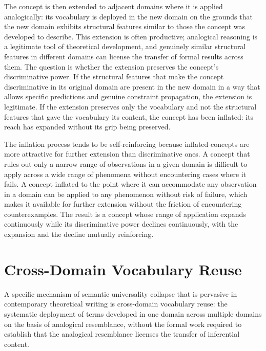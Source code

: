 \documentclass[12pt, openright, twoside]{book}
\begin{document}
The concept is then extended to adjacent domains where
it is applied analogically: its vocabulary is deployed
in the new domain on the grounds that the new domain
exhibits structural features similar to those the
concept was developed to describe. This extension is
often productive; analogical reasoning is a legitimate
tool of theoretical development, and genuinely similar
structural features in different domains can license
the transfer of formal results across them. The question
is whether the extension preserves the concept's
discriminative power. If the structural features that
make the concept discriminative in its original domain
are present in the new domain in a way that allows
specific predictions and genuine constraint propagation,
the extension is legitimate. If the extension preserves
only the vocabulary and not the structural features
that gave the vocabulary its content, the concept
has been inflated: its reach has expanded without
its grip being preserved.

The inflation process tends to be self-reinforcing
because inflated concepts are more attractive for
further extension than discriminative ones. A concept
that rules out only a narrow range of observations
in a given domain is difficult to apply across a
wide range of phenomena without encountering cases
where it fails. A concept inflated to the point where
it can accommodate any observation in a domain can
be applied to any phenomenon without risk of failure,
which makes it available for further extension without
the friction of encountering counterexamples. The
result is a concept whose range of application expands
continuously while its discriminative power declines
continuously, with the expansion and the decline
mutually reinforcing.

\section{Cross-Domain Vocabulary Reuse}

A specific mechanism of semantic universality collapse
that is pervasive in contemporary theoretical writing
is cross-domain vocabulary reuse: the systematic
deployment of terms developed in one domain across
multiple domains on the basis of analogical resemblance,
without the formal work required to establish that
the analogical resemblance licenses the transfer of
inferential content.
\end{document}
